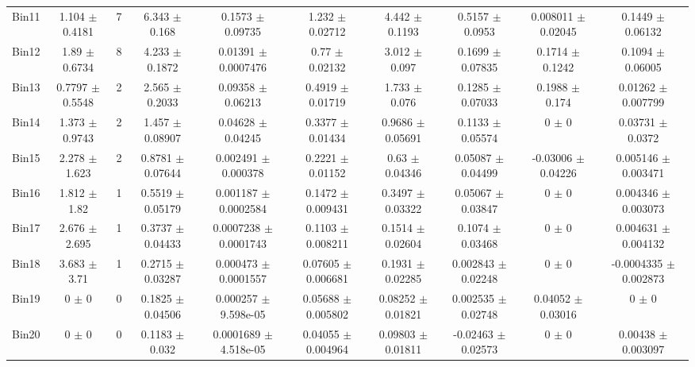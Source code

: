 \begin{tabular}{@{\extracolsep{4pt}}lccccccccc@{}}
     Bin11 & 1.104 $\pm$ 0.4181 & 7 & 6.343 $\pm$ 0.168 & 0.1573 $\pm$ 0.09735 & 1.232 $\pm$ 0.02712 & 4.442 $\pm$ 0.1193 & 0.5157 $\pm$ 0.0953 & 0.008011 $\pm$ 0.02045 & 0.1449 $\pm$ 0.06132 \\ 
     Bin12 & 1.89 $\pm$ 0.6734 & 8 & 4.233 $\pm$ 0.1872 & 0.01391 $\pm$ 0.0007476 & 0.77 $\pm$ 0.02132 & 3.012 $\pm$ 0.097 & 0.1699 $\pm$ 0.07835 & 0.1714 $\pm$ 0.1242 & 0.1094 $\pm$ 0.06005 \\ 
     Bin13 & 0.7797 $\pm$ 0.5548 & 2 & 2.565 $\pm$ 0.2033 & 0.09358 $\pm$ 0.06213 & 0.4919 $\pm$ 0.01719 & 1.733 $\pm$ 0.076 & 0.1285 $\pm$ 0.07033 & 0.1988 $\pm$ 0.174 & 0.01262 $\pm$ 0.007799 \\ 
     Bin14 & 1.373 $\pm$ 0.9743 & 2 & 1.457 $\pm$ 0.08907 & 0.04628 $\pm$ 0.04245 & 0.3377 $\pm$ 0.01434 & 0.9686 $\pm$ 0.05691 & 0.1133 $\pm$ 0.05574 & 0 $\pm$ 0 & 0.03731 $\pm$ 0.0372 \\ 
     Bin15 & 2.278 $\pm$ 1.623 & 2 & 0.8781 $\pm$ 0.07644 & 0.002491 $\pm$ 0.000378 & 0.2221 $\pm$ 0.01152 & 0.63 $\pm$ 0.04346 & 0.05087 $\pm$ 0.04499 & -0.03006 $\pm$ 0.04226 & 0.005146 $\pm$ 0.003471 \\ 
     Bin16 & 1.812 $\pm$ 1.82 & 1 & 0.5519 $\pm$ 0.05179 & 0.001187 $\pm$ 0.0002584 & 0.1472 $\pm$ 0.009431 & 0.3497 $\pm$ 0.03322 & 0.05067 $\pm$ 0.03847 & 0 $\pm$ 0 & 0.004346 $\pm$ 0.003073 \\ 
     Bin17 & 2.676 $\pm$ 2.695 & 1 & 0.3737 $\pm$ 0.04433 & 0.0007238 $\pm$ 0.0001743 & 0.1103 $\pm$ 0.008211 & 0.1514 $\pm$ 0.02604 & 0.1074 $\pm$ 0.03468 & 0 $\pm$ 0 & 0.004631 $\pm$ 0.004132 \\ 
     Bin18 & 3.683 $\pm$ 3.71 & 1 & 0.2715 $\pm$ 0.03287 & 0.000473 $\pm$ 0.0001557 & 0.07605 $\pm$ 0.006681 & 0.1931 $\pm$ 0.02285 & 0.002843 $\pm$ 0.02248 & 0 $\pm$ 0 & -0.0004335 $\pm$ 0.002873 \\ 
     Bin19 & 0 $\pm$ 0 & 0 & 0.1825 $\pm$ 0.04506 & 0.000257 $\pm$ 9.598e-05 & 0.05688 $\pm$ 0.005802 & 0.08252 $\pm$ 0.01821 & 0.002535 $\pm$ 0.02748 & 0.04052 $\pm$ 0.03016 & 0 $\pm$ 0 \\ 
     Bin20 & 0 $\pm$ 0 & 0 & 0.1183 $\pm$ 0.032 & 0.0001689 $\pm$ 4.518e-05 & 0.04055 $\pm$ 0.004964 & 0.09803 $\pm$ 0.01811 & -0.02463 $\pm$ 0.02573 & 0 $\pm$ 0 & 0.00438 $\pm$ 0.003097 \\ 
\hline\hline
  \end{tabular}
